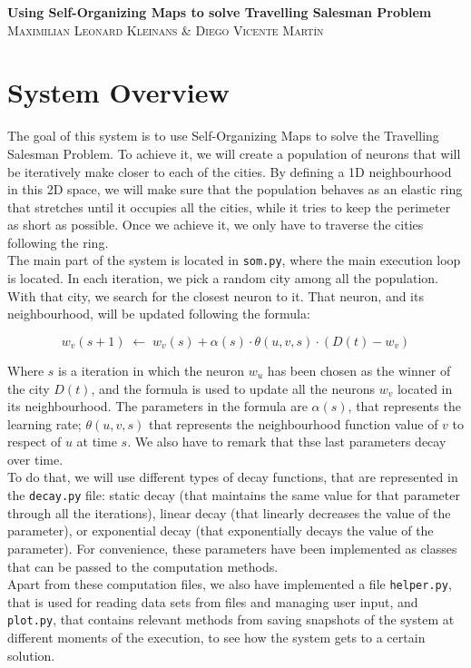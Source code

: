 \documentclass[11pt]{article}
\begin{document}
\begin{center}
  \Huge\textbf{Using Self-Organizing Maps to solve Travelling Salesman
    Problem}\\
  \vspace{1cm}
  \large\textsc{Maximilian Leonard Kleinans \& Diego Vicente Martín}
\end{center}

\section{System Overview}

The goal of this system is to use Self-Organizing Maps to solve the Travelling
Salesman Problem. To achieve it, we will create a population of neurons that
will be iteratively make closer to each of the cities. By defining a 1D
neighbourhood in this 2D space, we will make sure that the population behaves as
an elastic ring that stretches until it occupies all the cities, while it tries
to keep the perimeter as short as possible. Once we achieve it, we only have to
traverse the cities following the ring.\\

The main part of the system is located in \texttt{som.py}, where the main
execution loop is located. In each iteration, we pick a random city among all
the population. With that city, we search for the closest neuron to it. That
neuron, and its neighbourhood, will be updated following the formula:

$$
w_v(s+1) \; \leftarrow \;
w_v(s) + \alpha (s) \cdot \theta (u, v, s) \cdot (D(t) - w_v)
$$

Where $s$ is a iteration in which the neuron $w_u$ has been chosen as the
winner of the city $D(t)$, and the formula is used to update all the neurons
$w_v$ located in its neighbourhood. The parameters in the formula are $\alpha(s)$,
that represents the learning rate; $\theta(u, v, s)$ that represents the
neighbourhood function value of $v$ to respect of $u$ at time $s$. We also have
to remark that thse last parameters decay over time.\\

To do that, we will use different types of decay functions, that are represented
in the \texttt{decay.py} file: static decay (that maintains the same value for
that parameter through all the iterations), linear decay (that linearly
decreases the value of the parameter), or exponential decay (that exponentially
decays the value of the parameter). For convenience, these parameters have been
implemented as classes that can be passed to the computation methods.\\

Apart from these computation files, we also have implemented a file
\texttt{helper.py}, that is used for reading data sets from files and managing
user input, and \texttt{plot.py}, that contains relevant methods from saving
snapshots of the system at different moments of the execution, to see how the
system gets to a certain solution.
\end{document}

